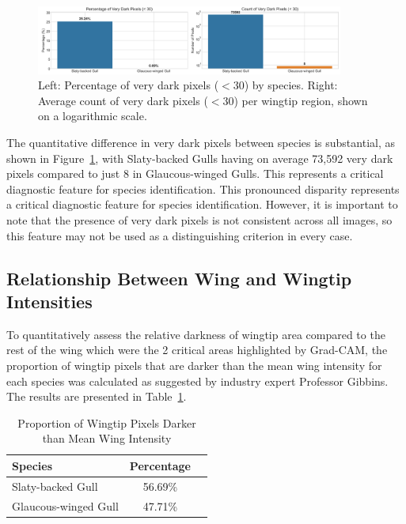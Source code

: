 \documentclass[a4paper,12pt]{report}
\begin{document}
\begin{figure}[H]
    \centering
    \includegraphics[width=0.9\textwidth]{images/REPORT_IMAGES_INTENSITY/I2/darkpixels.png}
    \caption{Left: Percentage of very dark pixels ($<$30) by species. Right: Average count of very dark pixels ($<$30) per wingtip region, shown on a logarithmic scale.}
    \label{fig:darkpixels}
\end{figure}

The quantitative difference in very dark pixels between species is substantial, as shown in Figure~\ref{fig:darkpixels}, with Slaty-backed Gulls having on average 73,592 very dark pixels compared to just 8 in Glaucous-winged Gulls. This represents a critical diagnostic feature for species identification. This pronounced disparity represents a critical diagnostic feature for species identification. However, it is important to note that the presence of very dark pixels is not consistent across all images, so this feature may not be used as a distinguishing criterion in every case.

\subsection{Relationship Between Wing and Wingtip Intensities}

To quantitatively assess the relative darkness of wingtip area compared to the rest of the wing which were the 2 critical areas highlighted by Grad-CAM, the proportion of wingtip pixels that are darker than the mean wing intensity for each species was calculated as suggested by industry expert Professor Gibbins.  The results are presented in Table~\ref{tab:darknessproportion}. 


\begin{table}[H]
    \centering
    \caption{Proportion of Wingtip Pixels Darker than Mean Wing Intensity}
    \label{tab:darknessproportion}
    \begin{tabular}{lcc}
        \toprule
        Species & Percentage \\
        \midrule
        Slaty-backed Gull & 56.69\% \\
        Glaucous-winged Gull & 47.71\% \\
        \bottomrule
    \end{tabular}
\end{table}
\end{document}
